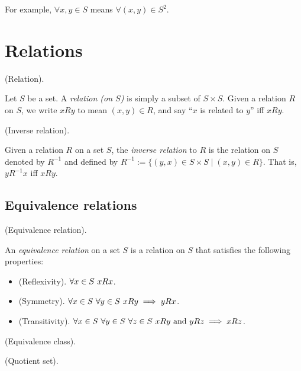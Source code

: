 For example, $\forall x, y \in S$ means $\forall (x, y) \in S^2$.

\section{Relations}

\begin{defn}
    (Relation).

    Let $S$ be a set. A \textit{relation (on $S$)} is simply a subset of $S \times S$. Given a relation $R$ on $S$, we write $xRy$ to mean $(x, y) \in R$, and say ``$x$ is related to $y$'' iff $xRy$.
\end{defn}

\begin{defn}
    (Inverse relation).

    Given a relation $R$ on a set $S$, the \textit{inverse relation} to $R$ is the relation on $S$ denoted by $R^{-1}$ and defined by $R^{-1} := \{(y, x) \in S \times S \mid (x, y) \in R\}$. That is, $yR^{-1}x$ iff $xRy$.
\end{defn}

\subsection*{Equivalence relations}

\begin{defn}
    (Equivalence relation).

    An \textit{equivalence relation} on a set $S$ is a relation on $S$ that satisfies the following properties:

    \begin{itemize}
        \item (Reflexivity). $\forall x \in S \text{ } xRx$.
        \item (Symmetry). $\forall x \in S \text{ } \forall y \in S \text{ } xRy \implies yRx$.
        \item (Transitivity). $\forall x \in S \text{ } \forall y \in S \text{ } \forall z \in S \text{ } xRy \text{ and } yRz \implies xRz$.
    \end{itemize}
\end{defn}

\begin{defn}
    (Equivalence class).
\end{defn}

\begin{defn}
\label{ch::logic_pf_fns::defn::quotient_set}

    (Quotient set).
\end{defn}

